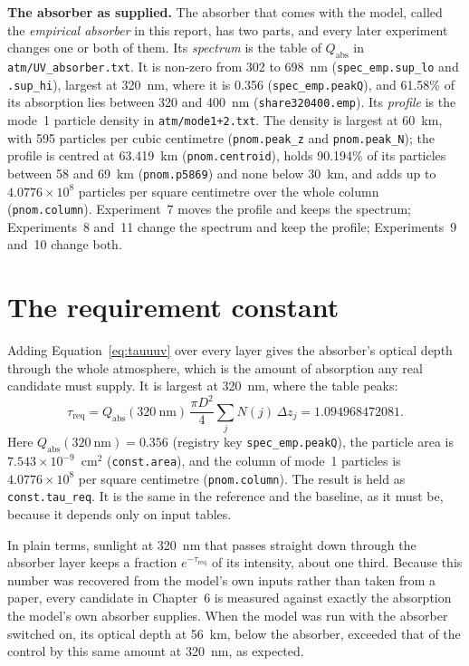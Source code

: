 \textbf{The absorber as supplied.} The absorber that comes with the model, called the
\emph{empirical absorber} in this report, has two parts, and every later experiment
changes one or both of them. Its \emph{spectrum} is the table of $Q_{\mathrm{abs}}$ in
\texttt{atm/UV\_absorber.txt}. It is non-zero from 302 to 698~nm
(\texttt{spec\_emp.sup\_lo} and \texttt{.sup\_hi}), largest at 320~nm, where it is 0.356
(\texttt{spec\_emp.peakQ}), and 61.58\% of its absorption lies between 320 and 400~nm
(\texttt{share320400.emp}). Its \emph{profile} is the mode~1 particle density in
\texttt{atm/mode1+2.txt}. The density is largest at 60~km, with 595 particles per cubic
centimetre (\texttt{pnom.peak\_z} and \texttt{pnom.peak\_N}); the profile is centred at
63.419~km (\texttt{pnom.centroid}), holds 90.194\% of its particles between 58 and 69~km
(\texttt{pnom.p5869}) and none below 30~km, and adds up to $4.0776\times10^{8}$ particles
per square centimetre over the whole column (\texttt{pnom.column}). Experiment~7 moves the
profile and keeps the spectrum; Experiments~8 and~11 change the spectrum and keep the
profile; Experiments~9 and~10 change both.

\section{The requirement constant}
\label{sec:taureq}

Adding Equation~\eqref{eq:tauuuv} over every layer gives the absorber's optical depth
through the whole atmosphere, which is the amount of absorption any real candidate must
supply. It is largest at 320~nm, where the table peaks:
\begin{equation}
  \tau_{\mathrm{req}} = Q_{\mathrm{abs}}(320~\mathrm{nm})\,\frac{\pi D^{2}}{4}
    \sum_{j} N(j)\,\Delta z_j = 1.094968472081 .
  \label{eq:taureq}
\end{equation}
Here $Q_{\mathrm{abs}}(320~\mathrm{nm}) = 0.356$ (registry key
\texttt{spec\_emp.peakQ}), the particle area is $7.543\times10^{-9}$~cm$^{2}$
(\texttt{const.area}), and the column of mode~1 particles is
$4.0776\times10^{8}$ per square centimetre (\texttt{pnom.column}). The result is held
as \texttt{const.tau\_req}. It is the same in the reference and the baseline, as it must
be, because it depends only on input tables.

In plain terms, sunlight at 320~nm that passes straight down through the absorber layer
keeps a fraction $e^{-\tau_{\mathrm{req}}}$ of its intensity, about one third. Because this number was recovered from the model's own inputs rather than taken
from a paper, every candidate in Chapter~6 is measured against exactly the absorption the
model's own absorber supplies. When the model was run with the absorber switched on, its
optical depth at 56~km, below the absorber, exceeded that of the control by this same
amount at 320~nm, as expected.

